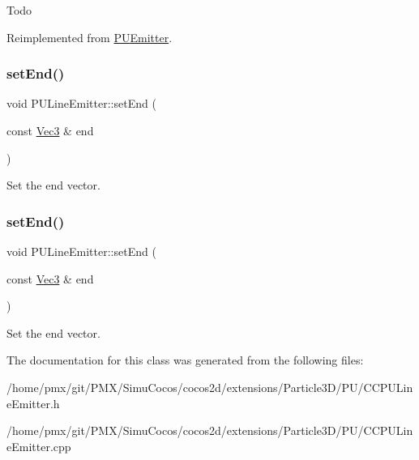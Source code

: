 Todo 

Reimplemented from \hyperlink{classPUEmitter_a2449f31b73c94a55f6559be71d56ca61}{P\+U\+Emitter}.

\mbox{\label{classPULineEmitter_ab52d86f473828f9e37f0a59244a02f43}} 
\subsubsection{\texorpdfstring{set\+End()}{setEnd()}\hspace{0.1cm}{\footnotesize\ttfamily [1/2]}}
{\footnotesize\ttfamily void P\+U\+Line\+Emitter\+::set\+End (\begin{DoxyParamCaption}\item[{const \hyperlink{classVec3}{Vec3} \&}]{end }\end{DoxyParamCaption})}

Set the end vector. \mbox{\label{classPULineEmitter_ab52d86f473828f9e37f0a59244a02f43}} 
\subsubsection{\texorpdfstring{set\+End()}{setEnd()}\hspace{0.1cm}{\footnotesize\ttfamily [2/2]}}
{\footnotesize\ttfamily void P\+U\+Line\+Emitter\+::set\+End (\begin{DoxyParamCaption}\item[{const \hyperlink{classVec3}{Vec3} \&}]{end }\end{DoxyParamCaption})}

Set the end vector. 

The documentation for this class was generated from the following files\+:\begin{DoxyCompactItemize}
\item 
/home/pmx/git/\+P\+M\+X/\+Simu\+Cocos/cocos2d/extensions/\+Particle3\+D/\+P\+U/C\+C\+P\+U\+Line\+Emitter.\+h\item 
/home/pmx/git/\+P\+M\+X/\+Simu\+Cocos/cocos2d/extensions/\+Particle3\+D/\+P\+U/C\+C\+P\+U\+Line\+Emitter.\+cpp\end{DoxyCompactItemize}
